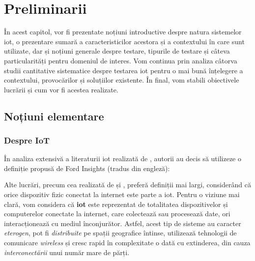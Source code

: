 \chapter{Preliminarii}

În acest capitol, vor fi prezentate noțiuni introductive despre natura sistemelor \acrfull{iot}, o prezentare sumară a caracteristicilor acestora și a contextului în care sunt utilizate, dar și noțiuni generale despre testare, tipurile de testare și câteva particularități pentru domeniul de interes. Vom continua prin analiza câtorva studii cantitative sistematice despre testarea \acrshort{iot} pentru o mai bună înțelegere a contextului, provocărilor și soluțiilor existente. În final, vom stabili obiectivele lucrării și cum vor fi acestea realizate.

\section{Noțiuni elementare}

\subsection*{Despre IoT}


În analiza extensivă a literaturii \acrshort{iot} realizată de \citet{Nord2019}, autorii au decis să utilizeze o definiție propusă de Ford Insights \citet{insight2017internet} (tradus din engleză):



Alte lucrări, precum cea realizată de \citet{Lee2015} și \citet{Huang2015}, preferă definiții mai largi, considerând că orice dispozitiv fizic conectat la internet este parte a \acrshort{iot}. Pentru o viziune mai clară, vom considera că \textbf{\acrshort{iot}} este reprezentat de totalitatea dispozitivelor și computerelor conectate la internet, care colectează sau procesează date, ori interacționează cu mediul înconjurător. Astfel, acest tip de sisteme au caracter \emph{eterogen}, pot fi \emph{distribuite} pe spații geografice întinse, utilizează tehnologii de comunicare \emph{wireless} și cresc rapid în complexitate o dată cu extinderea, din cauza \emph{interconectării} unui număr mare de părți.

